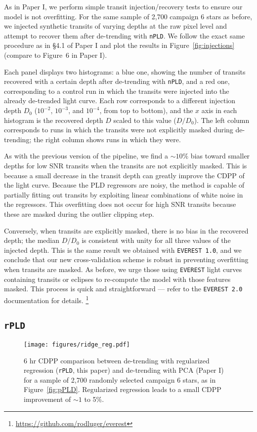 \documentclass[]{emulateapj}
\begin{document}
As in Paper I, we perform simple transit injection/recovery tests to ensure
our model is not overfitting. For the same sample of 2,700 campaign 6 stars
as before, we injected synthetic transits of varying depths at the raw pixel level
and attempt to recover them after de-trending with \texttt{nPLD}. We follow
the exact same procedure as in \S4.1 of Paper I and plot the results in
Figure~\ref{fig:injections} (compare to Figure~6 in Paper I).

Each panel displays two histograms: a blue one, showing the number of
transits recovered with a certain depth after de-trending with \texttt{nPLD},
and a red one, corresponding to a control run in which the transits were injected
into the already de-trended light curve. Each row corresponds to a different
injection depth $D_0$ ($10^{-2}$, $10^{-3}$, and $10^{-4}$, from top to bottom), and the $x$ axis
in each histogram is the recovered depth $D$ scaled to this value ($D/D_0$). The
left column corresponds to runs in which the transits were not explicitly masked
during de-trending; the right column shows runs in which they were.

As with the previous version of the pipeline, we find a ${\sim}10\%$ bias toward
smaller depths for low SNR transits when the transits are not explicitly masked. This
is because a small decrease in the transit depth can greatly improve the CDPP
of the light curve. Because the PLD regressors are noisy, the method is capable
of partially fitting out transits by exploiting linear combinations of white noise
in the regressors. This overfitting does not occur for high SNR transits because these
are masked during the outlier clipping step.

Conversely, when transits are explicitly masked, there is no bias in the recovered
depth; the median $D/D_0$ is consistent with unity for all three values of the injected
depth. This is the same result we obtained with \texttt{EVEREST 1.0}, and we conclude
that our new cross-validation scheme is robust in preventing overfitting when transits
are masked. As before, we urge those using \texttt{EVEREST} light curves containing
transits or eclipses to re-compute the model with those features masked. This process
is quick and straightforward --- refer to the \texttt{EVEREST 2.0} documentation for
details.
\footnote{\url{https://github.com/rodluger/everest}}

\subsection{\texttt{rPLD}}
\begin{figure}[hbt]
  \begin{center}
      \texttt{[image: figures/ridge\_reg.pdf]}
       \caption{6 hr CDPP comparison between de-trending with regularized regression (\texttt{rPLD}, this paper) and
                de-trending with PCA (Paper I) for a sample of 2,700 randomly selected campaign 6
                stars, as in Figure~\ref{fig:pPLD}. Regularized regression leads to a small CDPP improvement of
                ${\sim}1$ to 5\%.}
     \label{fig:rPLD}
  \end{center}
\end{figure}
\end{document}
